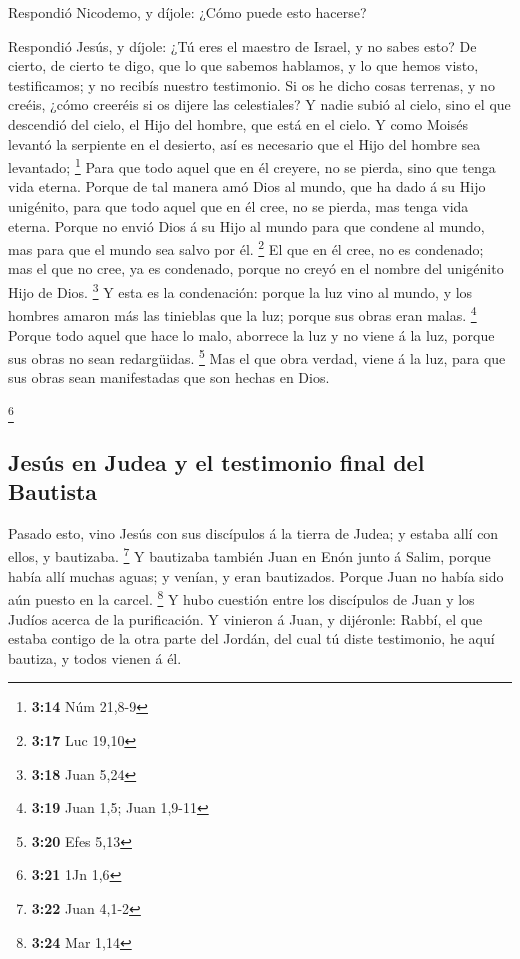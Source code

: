  Respondió Nicodemo, y díjole: ¿Cómo puede esto hacerse?

 Respondió Jesús, y díjole: ¿Tú eres el maestro de Israel,
y no sabes esto?  De cierto, de cierto te digo, que lo que
sabemos hablamos, y lo que hemos visto, testificamos; y no recibís
nuestro testimonio.  Si os he dicho cosas terrenas, y no
creéis, ¿cómo creeréis si os dijere las celestiales?  Y
nadie subió al cielo, sino el que descendió del cielo, el Hijo del
hombre, que está en el cielo.  Y como Moisés levantó la
serpiente en el desierto, así es necesario que el Hijo del hombre sea
levantado; \footnote{\textbf{3:14} Núm 21,8-9}  Para que
todo aquel que en él creyere, no se pierda, sino que tenga vida eterna.
 Porque de tal manera amó Dios al mundo, que ha dado á su
Hijo unigénito, para que todo aquel que en él cree, no se pierda, mas
tenga vida eterna.  Porque no envió Dios á su Hijo al mundo
para que condene al mundo, mas para que el mundo sea salvo por él.
\footnote{\textbf{3:17} Luc 19,10}  El que en él cree, no
es condenado; mas el que no cree, ya es condenado, porque no creyó en el
nombre del unigénito Hijo de Dios. \footnote{\textbf{3:18} Juan 5,24}
 Y esta es la condenación: porque la luz vino al mundo, y
los hombres amaron más las tinieblas que la luz; porque sus obras eran
malas. \footnote{\textbf{3:19} Juan 1,5; Juan 1,9-11} 
Porque todo aquel que hace lo malo, aborrece la luz y no viene á la luz,
porque sus obras no sean redargüidas. \footnote{\textbf{3:20} Efes 5,13}
 Mas el que obra verdad, viene á la luz, para que sus obras
sean manifestadas que son hechas en Dios.

\footnote{\textbf{3:21} 1Jn 1,6}

\hypertarget{jesuxfas-en-judea-y-el-testimonio-final-del-bautista}{%
\subsection{Jesús en Judea y el testimonio final del
Bautista}\label{jesuxfas-en-judea-y-el-testimonio-final-del-bautista}}

 Pasado esto, vino Jesús con sus discípulos á la tierra de
Judea; y estaba allí con ellos, y bautizaba. \footnote{\textbf{3:22}
  Juan 4,1-2}  Y bautizaba también Juan en Enón junto á
Salim, porque había allí muchas aguas; y venían, y eran bautizados.
 Porque Juan no había sido aún puesto en la carcel.
\footnote{\textbf{3:24} Mar 1,14}  Y hubo cuestión entre
los discípulos de Juan y los Judíos acerca de la purificación.
 Y vinieron á Juan, y dijéronle: Rabbí, el que estaba
contigo de la otra parte del Jordán, del cual tú diste testimonio, he
aquí bautiza, y todos vienen á él.

